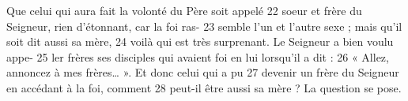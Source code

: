 Que celui qui aura fait la volonté du Père soit appelé	 
22	 	soeur et frère du Seigneur, rien d'étonnant, car la foi ras-	 
23	 	semble l'un et l'autre sexe ; mais qu'il soit dit aussi sa mère,	 
24	 	voilà qui est très surprenant. Le Seigneur a bien voulu appe-	 
25	 	ler frères ses disciples qui avaient foi en lui lorsqu'il a dit :	 
26	 	« Allez, annoncez à mes frères… ». Et donc celui qui a pu	 
27	 	devenir un frère du Seigneur en accédant à la foi, comment	 
28	 	peut-il être aussi sa mère ? La question se pose.